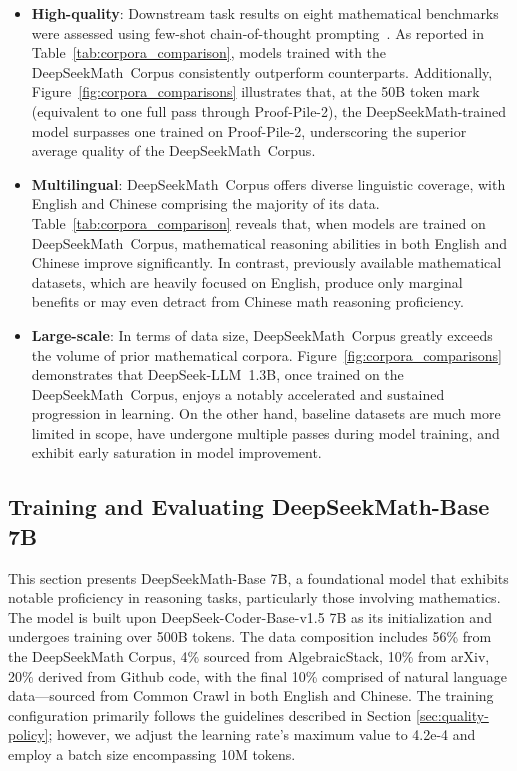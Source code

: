 \begin{itemize}[topsep=0pt]
\begin{itemize}[topsep=0pt]
    \item \textbf{High-quality}:  
    Downstream task results on eight mathematical benchmarks were assessed using few-shot chain-of-thought prompting~\cite{cot}. As reported in Table~\ref{tab:corpora_comparison}, models trained with the DeepSeekMath~Corpus consistently outperform counterparts. Additionally, Figure~\ref{fig:corpora_comparisons} illustrates that, at the 50B token mark (equivalent to one full pass through Proof-Pile-2), the DeepSeekMath-trained model surpasses one trained on Proof-Pile-2, underscoring the superior average quality of the DeepSeekMath~Corpus. 

    \item \textbf{Multilingual}:  
    DeepSeekMath~Corpus offers diverse linguistic coverage, with English and Chinese comprising the majority of its data. Table~\ref{tab:corpora_comparison} reveals that, when models are trained on DeepSeekMath~Corpus, mathematical reasoning abilities in both English and Chinese improve significantly. In contrast, previously available mathematical datasets, which are heavily focused on English, produce only marginal benefits or may even detract from Chinese math reasoning proficiency.

    \item \textbf{Large-scale}:  
    In terms of data size, DeepSeekMath~Corpus greatly exceeds the volume of prior mathematical corpora. Figure~\ref{fig:corpora_comparisons} demonstrates that DeepSeek-LLM~1.3B, once trained on the DeepSeekMath~Corpus, enjoys a notably accelerated and sustained progression in learning. On the other hand, baseline datasets are much more limited in scope, have undergone multiple passes during model training, and exhibit early saturation in model improvement.
\end{itemize}

\subsection{Training and Evaluating DeepSeekMath-Base 7B}

This section presents DeepSeekMath-Base 7B, a foundational model that exhibits notable proficiency in reasoning tasks, particularly those involving mathematics. The model is built upon DeepSeek-Coder-Base-v1.5 7B \citep{deepseek-coder} as its initialization and undergoes training over 500B tokens. The data composition includes 56\% from the DeepSeekMath Corpus, 4\% sourced from AlgebraicStack, 10\% from arXiv, 20\% derived from Github code, with the final 10\% comprised of natural language data—sourced from Common Crawl in both English and Chinese. The training configuration primarily follows the guidelines described in Section \ref{sec:quality-policy}; however, we adjust the learning rate's maximum value to 4.2e-4 and employ a batch size encompassing 10M tokens.


\end{itemize}

